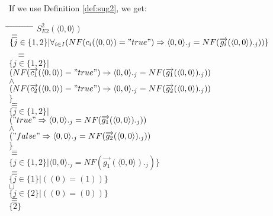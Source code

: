 \index{}\documentclass[a4paper,10pt]{article}
\theoremstyle{plain}
\theoremstyle{definition}
\newcommand{\ovr}{\overrightarrow}
\begin{document}
\begin{defn}
\begin{example}
\begin{verbatim}
\end{verbatim}
\end{example}
If we use Definition \ref{def:sug2}, we get:
\begin{tabbing}
\hspace*{5.mm} \= \hspace*{5.mm} \= \hspace*{5.mm} \= \hspace*{5.mm} \= \hspace*{5.mm} \= \hspace*{5.mm}  \= \hspace*{5.mm}  \= \hspace*{5.mm}  \= \hspace*{5.mm} \= \hspace*{5.mm} \= \hspace*{5.mm}\kill
\> \> $S_{E2}^2(\langle 0, 0 \rangle)$\\
\> $\equiv$\\
\> \> $\lbrace j \in \lbrace 1, 2 \rbrace \vert \forall_{i\in I} (NF(c_i( \langle  0,  0\rangle ) = "true") \Rightarrow  \langle  0,  0\rangle._j = NF(\ovr{g_i}( \langle  0,  0\rangle)._j))\rbrace $\\\
\> $\equiv$ \\
\> \>$\lbrace j \in \lbrace 1, 2 \rbrace \vert $ \\
\> \> \> $(NF(\ovr{c_1}( \langle  0,  0\rangle ) = "true") \Rightarrow  \langle  0,  0\rangle._j = NF(\ovr{g_{1}}( \langle  0,  0\rangle)._j)) $\\
\> \> \> $\wedge$ \\
\> \> \> $ (NF(\ovr{c_2}( \langle  0,  0\rangle ) = "true") \Rightarrow  \langle  0,  0\rangle._j = NF(\ovr{g_{2}}( \langle  0,  0\rangle)._j)) $ \\
\> \>$
\rbrace $\\
\> $\equiv$ \\
\> \> $\lbrace j \in \lbrace 1, 2 \rbrace \vert $\\
\> \> \> $("true" \Rightarrow  \langle  0,  0\rangle._j = NF(\ovr{g_{1}}( \langle  0,  0\rangle)._j))$ \\
\> \> \> $\wedge$ \\
\> \> \> $("false" \Rightarrow  \langle  0,  0\rangle._j = NF(\ovr{g_{2}}( \langle  0,  0\rangle)._j))$ \\
\> \> $\rbrace $\\
\> $\equiv$ \\
\> \> $\lbrace j \in \lbrace 1, 2 \rbrace \vert
\langle  0,  0\rangle._j = NF(\ovr{g_1}( \langle  0,  0\rangle)._j)
\rbrace $\\
\> $\equiv$\\
\> \> $\lbrace j \in \lbrace 1 \rbrace \vert (( 0)  = ( 1)) \rbrace $\\
\> \> $\cup$ \\
\> \> $\lbrace j \in \lbrace 2 \rbrace \vert (( 0)  = ( 0)) \rbrace $\\
\> $\equiv $ \\
\> \> $\lbrace 2 \rbrace$ \\
\end{tabbing}


\end{defn}
\end{document}

